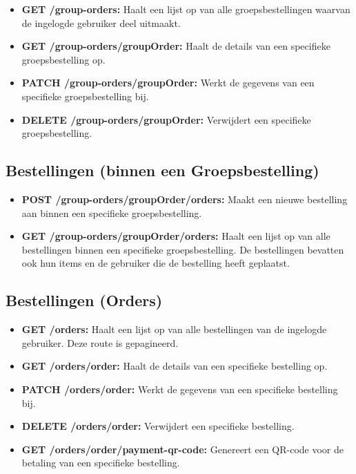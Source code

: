\begin{itemize}
  \item \textbf{GET /group-orders:} Haalt een lijst op van alle groepsbestellingen waarvan de ingelogde gebruiker deel uitmaakt.
  \item \textbf{GET /group-orders/{groupOrder}:} Haalt de details van een specifieke groepsbestelling op.
  \item \textbf{PATCH /group-orders/{groupOrder}:} Werkt de gegevens van een specifieke groepsbestelling bij.
  \item \textbf{DELETE /group-orders/{groupOrder}:} Verwijdert een specifieke groepsbestelling.
\end{itemize}

\subsection{Bestellingen (binnen een Groepsbestelling)}

\begin{itemize}
  \item \textbf{POST /group-orders/{groupOrder}/orders:} Maakt een nieuwe bestelling aan binnen een specifieke groepsbestelling.
  \item \textbf{GET /group-orders/{groupOrder}/orders:} Haalt een lijst op van alle bestellingen binnen een specifieke groepsbestelling. De bestellingen bevatten ook hun items en de gebruiker die de bestelling heeft geplaatst.
\end{itemize}

\subsection{Bestellingen (Orders)}

\begin{itemize}
  \item \textbf{GET /orders:} Haalt een lijst op van alle bestellingen van de ingelogde gebruiker. Deze route is gepagineerd.
  \item \textbf{GET /orders/{order}:} Haalt de details van een specifieke bestelling op.
  \item \textbf{PATCH /orders/{order}:} Werkt de gegevens van een specifieke bestelling bij.
  \item \textbf{DELETE /orders/{order}:} Verwijdert een specifieke bestelling.
  \item \textbf{GET /orders/{order}/payment-qr-code:} Genereert een QR-code voor de betaling van een specifieke bestelling.
\end{itemize}

